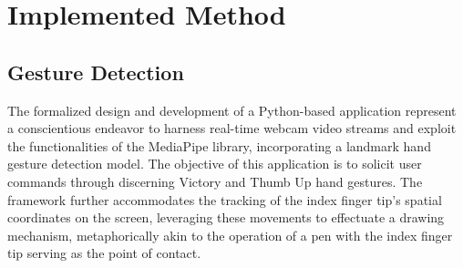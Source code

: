 \documentclass[journal]{IEEEtran}
\begin{document}
%




\section{Implemented Method}
\subsection*{Gesture Detection}
The formalized design and development of a Python-based application represent a conscientious endeavor to harness real-time webcam 
video streams and exploit the functionalities of the MediaPipe library, incorporating a landmark hand gesture detection model. 
The objective of this application is to solicit user commands through discerning Victory and Thumb Up hand gestures. The framework 
further accommodates the tracking of the index finger tip's spatial coordinates on the screen, leveraging these movements to 
effectuate a drawing mechanism, metaphorically akin to the operation of a pen with the index finger tip serving as the point of contact.
\end{document}
